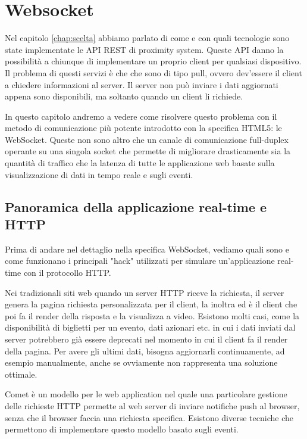 \chapter{Websocket}
\label{chap:websocket}
\nocite{html5}
Nel capitolo \ref{chap:scelta} abbiamo parlato di come e con quali tecnologie sono state implementate le API REST di proximity system.  
Queste API danno la possibilità a chiunque di implementare un proprio client per qualsiasi dispositivo. 
Il problema di questi servizi è che che sono di tipo pull, ovvero dev'essere il client a chiedere informazioni al server. 
Il server non può inviare i dati aggiornati appena sono disponibili,
ma soltanto quando un client li richiede.

In questo capitolo andremo a vedere come risolvere questo problema con il metodo di comunicazione più potente introdotto con la specifica HTML5: le WebSocket.
Queste non sono altro che un canale di comunicazione full-duplex operante su una singola socket che permette di migliorare drasticamente sia la quantità di traffico che la latenza di tutte le applicazione web basate sulla visualizzazione di dati in tempo reale e sugli eventi.
  
\section{Panoramica della applicazione real-time e HTTP}
\label{sec:real-time}
Prima di andare nel dettaglio nella specifica WebSocket, vediamo quali sono e come funzionano i principali "hack" utilizzati per simulare un'applicazione real-time con il protocollo HTTP.

Nei tradizionali siti web quando un server HTTP riceve la richiesta, il server genera la pagina richiesta personalizzata per il client, la inoltra ed è il client che poi fa il render della risposta e la visualizza a video.
Esistono molti casi, come la disponibilità di biglietti per un evento, dati azionari etc. in cui i dati inviati dal server potrebbero già essere deprecati nel momento in cui il client fa il render della pagina. 
Per avere gli ultimi dati, bisogna aggiornarli continuamente, ad esempio manualmente, anche se ovviamente non rappresenta una soluzione ottimale.

Comet è un modello per le web application nel quale una particolare gestione 
delle richieste HTTP permette al web server di inviare notifiche push al browser, senza che il browser faccia una richiesta specifica.
Esistono diverse tecniche che permettono di implementare questo modello basato sugli eventi. 

